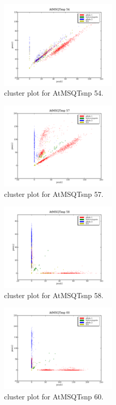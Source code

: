 \begin{figure}[H]
\includegraphics[width=0.5\textwidth]{figures/cluster_plot_AtMSQTsnp_54.png}
\caption{cluster plot for AtMSQTsnp 54.} \label{flAtMSQTsnp54}
\end{figure}

\begin{figure}[H]
\includegraphics[width=0.5\textwidth]{figures/cluster_plot_AtMSQTsnp_57.png}
\caption{cluster plot for AtMSQTsnp 57.} \label{flAtMSQTsnp57}
\end{figure}

\begin{figure}[H]
\includegraphics[width=0.5\textwidth]{figures/cluster_plot_AtMSQTsnp_58.png}
\caption{cluster plot for AtMSQTsnp 58.} \label{flAtMSQTsnp58}
\end{figure}

\begin{figure}[H]
\includegraphics[width=0.5\textwidth]{figures/cluster_plot_AtMSQTsnp_60.png}
\caption{cluster plot for AtMSQTsnp 60.} \label{flAtMSQTsnp60}
\end{figure}


